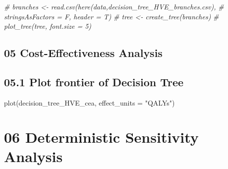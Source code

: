 \documentclass[
]{article}
\newenvironment{Shaded}{\begin{snugshade}}{\end{snugshade}}
\newcommand{\AttributeTok}[1]{\textcolor[rgb]{0.77,0.63,0.00}{#1}}
\newcommand{\CommentTok}[1]{\textcolor[rgb]{0.56,0.35,0.01}{\textit{#1}}}
\newcommand{\FunctionTok}[1]{\textcolor[rgb]{0.00,0.00,0.00}{#1}}
\newcommand{\NormalTok}[1]{#1}
\newcommand{\OtherTok}[1]{\textcolor[rgb]{0.56,0.35,0.01}{#1}}
\newcommand{\SpecialCharTok}[1]{\textcolor[rgb]{0.00,0.00,0.00}{#1}}
\newcommand{\StringTok}[1]{\textcolor[rgb]{0.31,0.60,0.02}{#1}}
\begin{document}
\begin{Shaded}
\begin{Highlighting}[]
\CommentTok{\# branches \textless{}{-} read.csv(here(\textquotesingle{}data\textquotesingle{},\textquotesingle{}decision\_tree\_HVE\_branches.csv\textquotesingle{}), }
\CommentTok{\#                      stringsAsFactors = F, header = T)}
\CommentTok{\# tree     \textless{}{-} create\_tree(branches)}
\CommentTok{\# plot\_tree(tree, font.size = 5)}
\end{Highlighting}
\end{Shaded}

\hypertarget{cost-effectiveness-analysis}{%
\subsection{05 Cost-Effectiveness
Analysis}\label{cost-effectiveness-analysis}}

\begin{Shaded}
\end{Shaded}

\hypertarget{plot-frontier-of-decision-tree}{%
\subsection{05.1 Plot frontier of Decision
Tree}\label{plot-frontier-of-decision-tree}}

\begin{Shaded}
\begin{Highlighting}[]
\FunctionTok{plot}\NormalTok{(decision\_tree\_HVE\_cea, }\AttributeTok{effect\_units =} \StringTok{"QALYs"}\NormalTok{)}
\end{Highlighting}
\end{Shaded}

\hypertarget{deterministic-sensitivity-analysis}{%
\section{06 Deterministic Sensitivity
Analysis}\label{deterministic-sensitivity-analysis}}
\end{document}

